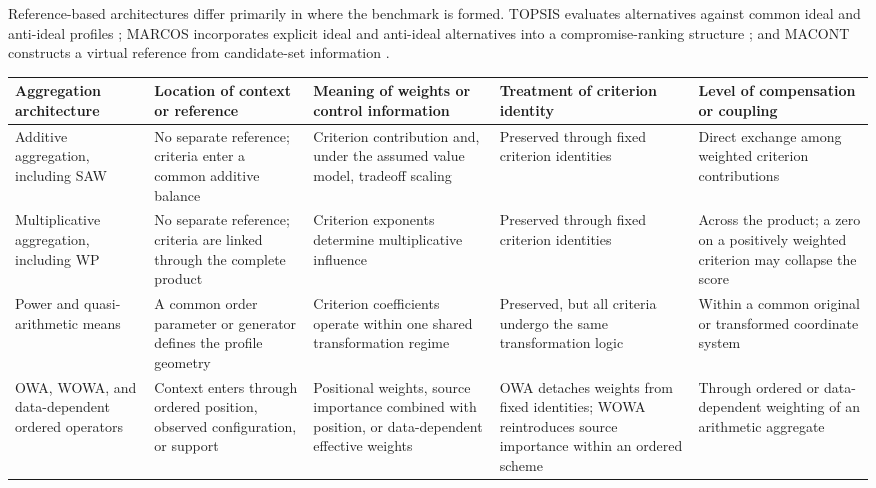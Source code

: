 \documentclass[reqno,11pt]{amsart}
\theoremstyle{definition}
\theoremstyle{plain}
\theoremstyle{remark}
\begin{document}
Reference-based architectures differ primarily in where the benchmark is
formed. TOPSIS evaluates alternatives against common ideal and anti-ideal
profiles \cite{HwangYoon1981}; MARCOS incorporates explicit ideal and
anti-ideal alternatives into a compromise-ranking structure
\cite{Stevic2020}; and MACONT constructs a virtual reference from
candidate-set information \cite{Wen2020}.

\clearpage
\begin{landscape}
\begin{center}
\label{tab:conceptual-positioning}
\footnotesize
\renewcommand{\arraystretch}{1.18}
\setlength{\tabcolsep}{4pt}
\begin{tabularx}{\linewidth}{@{}p{3.3cm}p{4.4cm}p{4.8cm}p{4.0cm}X@{}}
\toprule
Aggregation architecture
&
Location of context or reference
&
Meaning of weights or control information
&
Treatment of criterion identity
&
Level of compensation or coupling
\\
\midrule

Additive aggregation, including SAW
&
No separate reference; criteria enter a common additive balance
&
Criterion contribution and, under the assumed value model, tradeoff scaling
&
Preserved through fixed criterion identities
&
Direct exchange among weighted criterion contributions
\\

Multiplicative aggregation, including WP
&
No separate reference; criteria are linked through the complete product
&
Criterion exponents determine multiplicative influence
&
Preserved through fixed criterion identities
&
Across the product; a zero on a positively weighted criterion may collapse the score
\\

Power and quasi-arithmetic means
&
A common order parameter or generator defines the profile geometry
&
Criterion coefficients operate within one shared transformation regime
&
Preserved, but all criteria undergo the same transformation logic
&
Within a common original or transformed coordinate system
\\

OWA, WOWA, and data-dependent ordered operators
&
Context enters through ordered position, observed configuration, or support
&
Positional weights, source importance combined with position, or data-dependent effective weights
&
OWA detaches weights from fixed identities; WOWA reintroduces source importance within an ordered scheme
&
Through ordered or data-dependent weighting of an arithmetic aggregate
\\


\end{tabularx}
\end{center}
\end{landscape}
\end{document}
